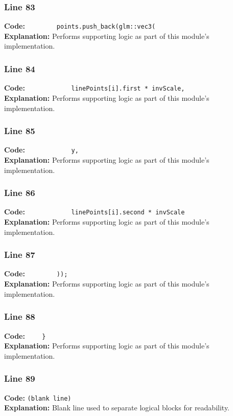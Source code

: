 \documentclass[11pt,a4paper]{article}
\begin{document}
\subsubsection*{Line 83}
\textbf{Code:} \verb|        points.push_back(glm::vec3(|\\
\textbf{Explanation:} Performs supporting logic as part of this module's implementation.

\subsubsection*{Line 84}
\textbf{Code:} \verb|            linePoints[i].first * invScale,|\\
\textbf{Explanation:} Performs supporting logic as part of this module's implementation.

\subsubsection*{Line 85}
\textbf{Code:} \verb|            y,|\\
\textbf{Explanation:} Performs supporting logic as part of this module's implementation.

\subsubsection*{Line 86}
\textbf{Code:} \verb|            linePoints[i].second * invScale|\\
\textbf{Explanation:} Performs supporting logic as part of this module's implementation.

\subsubsection*{Line 87}
\textbf{Code:} \verb|        ));|\\
\textbf{Explanation:} Performs supporting logic as part of this module's implementation.

\subsubsection*{Line 88}
\textbf{Code:} \verb|    }|\\
\textbf{Explanation:} Performs supporting logic as part of this module's implementation.

\subsubsection*{Line 89}
\textbf{Code:} \texttt{(blank line)}\\
\textbf{Explanation:} Blank line used to separate logical blocks for readability.
\end{document}
